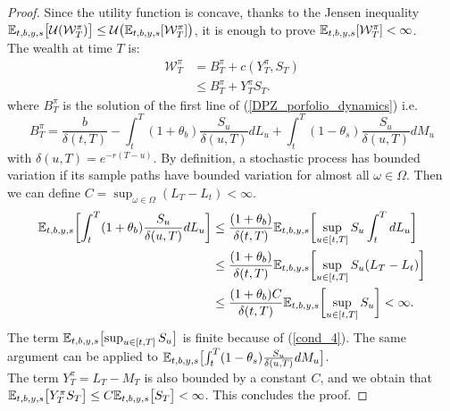 \begin{proof}
 Since the utility function is concave, thanks to the Jensen inequality $\mathbb{E}_{t,b,y,s} \bigl[\mathcal{U}(\mathcal{W}^{\pi}_T)\bigr] \leq 
 \mathcal{U}\bigl( \mathbb{E}_{t,b,y,s}[\mathcal{W}^{\pi}_T] \bigr)$,
 it is enough to prove $\mathbb{E}_{t,b,y,s}[\mathcal{W}^{\pi}_T] < \infty$.\\
 The wealth at time $T$ is:
 \begin{align*}
   \mathcal{W}^{\pi}_T &=  B^{\pi}_T + c(Y^{\pi}_T,S_T) \\
                       &\leq B^{\pi}_T + Y^{\pi}_T S_T.
 \end{align*}
 where $B^{\pi}_T$ is the solution of the first line of (\ref{DPZ_porfolio_dynamics}) i.e.
 \begin{equation*}
 B^{\pi}_T =  \frac{b}{\delta(t,T)} - \int_{t}^T
 (1+\theta_b)\frac{S_u}{\delta(u,T)} dL_u + \int_{t}^T
 (1-\theta_s) \frac{S_u}{\delta(u,T)} dM_u 
 \end{equation*}
 with $\delta(u,T) = e^{-r(T-u)}$.  
 By definition, a stochastic process has bounded variation if its sample paths have bounded variation for almost all $\omega \in \Omega$. 
 Then we can define $C = \sup_{\omega \in \Omega} (L_T-L_t) < \infty$.
 \begin{align*}
 \mathbb{E}_{t,b,y,s}\biggl[ \int_{t}^T (1+\theta_b)\frac{S_u}{\delta(u,T)} dL_u  \biggr] &\leq \frac{(1+\theta_b)}{\delta(t,T)} \mathbb{E}_{t,b,y,s}\biggl[ \sup_{u\in[t,T]} S_u \int_{t}^T dL_u  \biggr] \\
                                                                                &\leq \frac{(1+\theta_b)}{\delta(t,T)} \mathbb{E}_{t,b,y,s}\biggl[ \sup_{u\in[t,T]} S_u (L_T-L_t)  \biggr] \\
                                                                                &\leq \frac{(1+\theta_b)C}{\delta(t,T)} \mathbb{E}_{t,b,y,s}\biggl[ \sup_{u\in[t,T]} S_u \biggr] < \infty.
 \end{align*}
The term $\mathbb{E}_{t,b,y,s}\bigl[ \sup_{u\in[t,T]} S_u \bigr]$ is finite because of (\ref{cond_4}).
The same argument can be applied to $\mathbb{E}_{t,b,y,s}\bigl[ \int_{t}^T (1-\theta_s) \frac{S_u}{\delta(u,T)} dM_u \bigr]$.\\
The term $Y^{\pi}_T = L_T - M_T$ is also bounded by a constant $C$, and we obtain that $\mathbb{E}_{t,b,y,s}\bigl[ Y^{\pi}_T S_T \bigr] \leq C \mathbb{E}_{t,b,y,s}\bigl[ S_T \bigr] < \infty$.
This concludes the proof.
\end{proof}



